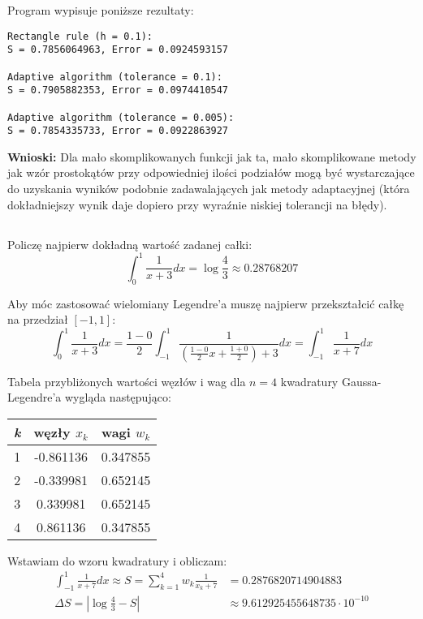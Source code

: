 \documentclass{article}
\begin{document}
\noindent
Program wypisuje poniższe rezultaty:

\begin{verbatim}
Rectangle rule (h = 0.1):
S = 0.7856064963, Error = 0.0924593157

Adaptive algorithm (tolerance = 0.1):
S = 0.7905882353, Error = 0.0974410547

Adaptive algorithm (tolerance = 0.005):
S = 0.7854335733, Error = 0.0922863927
\end{verbatim}

\noindent
\textbf{Wnioski:} Dla mało skomplikowanych funkcji jak ta, mało skomplikowane metody jak wzór prostokątów przy odpowiedniej ilości podziałów mogą być wystarczające do uzyskania wyników podobnie zadawalających jak metody adaptacyjnej (która dokładniejszy wynik daje dopiero przy wyraźnie niskiej tolerancji na błędy). 

\subsection{}
Policzę najpierw dokładną wartość zadanej całki:
\[\int_0^1 \frac{1}{x+3} dx = \log \frac{4}{3} \approx 0.28768207\]

\noindent
Aby móc zastosować wielomiany Legendre'a muszę najpierw przekształcić całkę na przedział \([-1, 1]\):
\[\int_0^1 \frac{1}{x+3} dx = \frac{1 - 0}{2} \int_{-1}^1 \frac{1}{\left(\frac{1 - 0}{2}x + \frac{1 + 0}{2}\right) + 3} dx = \int_{-1}^1 \frac{1}{x + 7} dx\]

\newpage

\noindent
Tabela przybliżonych wartości węzłów i wag dla \(n = 4\) kwadratury Gaussa-Legendre'a wygląda następująco:

\begin{table}[h]
    \centering
    \begin{tabular}{c|c|c}
        \textit{k} & węzły \(x_k\) & wagi \(w_k\)\\
        \hline
        1 & -0.861136 & 0.347855\\
        2 & -0.339981 & 0.652145\\
        3 & 0.339981 & 0.652145\\
        4 & 0.861136 & 0.347855
    \end{tabular}
    \label{tab:table2}
\end{table}

\noindent
Wstawiam do wzoru kwadratury i obliczam:
\begin{align*}
    \int_{-1}^1 \frac{1}{x + 7} dx \approx S = \sum_{k=1}^4 w_k \frac{1}{x_k + 7} &= 0.2876820714904883\\
    \Delta S = \left| \log \frac{4}{3} - S \right| &\approx 9.612925455648735 \cdot 10^{-10}
\end{align*}
\end{document}
